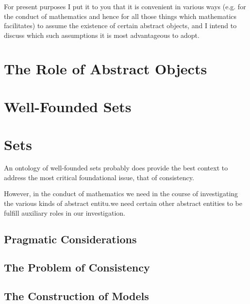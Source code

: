 \documentclass[numreferences]{rbjk}
\begin{document}
\begin{article}
For present purposes I put it to you that it is convenient in various ways (e.g. for the conduct of mathematics and hence for all those things which mathematics facilitates) to assume the existence of certain abstract objects, and I intend to discuss which such assumptions it is most advantageous to adopt.

\section{The Role of Abstract Objects}

\section{Well-Founded Sets}

\section{Sets}

An ontology of well-founded sets probably does provide the best context to address the most critical foundational issue, that of consistency.

However, in the conduct of mathematics we need in the course of investigating the various kinds of abstract entitu.we need certain other abstract entities to be fulfill auxiliary roles in our investigation.


\subsection{Pragmatic Considerations}

\subsection{The Problem of Consistency}

\subsection{The Construction of Models} 

%
%


\end{article}
\end{document}
